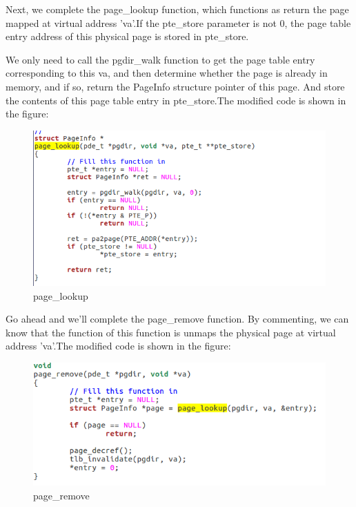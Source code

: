 Next, we complete the page\_lookup function, which functions as return the page mapped at virtual address 'va'.If the pte\_store parameter is not 0, the page table entry address of this physical page is stored in pte\_store.

We only need to call the pgdir\_walk function to get the page table entry corresponding to this va, and then determine whether the page is already in memory, and if so, return the PageInfo structure pointer of this page. And store the contents of this page table entry in pte\_store.The modified code is shown in the figure:
\begin{figure}[H]
\centering
\includegraphics[width=0.8\linewidth]{figure/page_lookup_changed}
\caption{page\_lookup}
\end{figure}

Go ahead and we'll complete the page\_remove function. By commenting, we can know that the function of this function is unmaps the physical page at virtual address 'va'.The modified code is shown in the figure:
\begin{figure}[H]
\centering
\includegraphics[width=0.8\linewidth]{figure/page_remove_changed}
\caption{page\_remove}
\end{figure}

